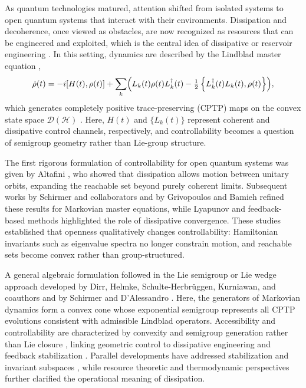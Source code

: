 \documentclass[11pt,reqno]{amsart}
\theoremstyle{definition}
\newcommand{\mc}{\mathcal}
\newcommand{\lset}{\left\{ }
\newcommand{\rset}{\right\} }
\begin{document}
As quantum technologies matured, attention shifted from isolated systems to open quantum systems that interact with their environments.  
Dissipation and decoherence, once viewed as obstacles, are now recognized as resources that can be engineered and exploited, which is the central idea of dissipative or reservoir engineering \cite{verstraete2009,diehl2008,lin2013,mirrahimi2014,leghtas2013,ofek2016,kapit2016}.  
In this setting, dynamics are described by the Lindblad master equation \cite{gorini1976,lindblad1976},
\begin{equation}
  \dot{\rho}(t) = -i[H(t),\rho(t)] 
  + \sum_k \Bigl(L_k(t)\rho(t)L_k^\dagger(t) 
  - \tfrac{1}{2}\lset L_k^\dagger(t)L_k(t), \rho(t)\rset \Bigr),
\end{equation}
which generates completely positive trace-preserving (CPTP) maps on the convex state space $\mc D(\mc H)$ \cite{alicki2007,breuer2002, rivas2012}.  
Here, $H(t)$ and $\{L_k(t)\}$ represent coherent and dissipative control channels, respectively, and controllability becomes a question of semigroup geometry rather than Lie-group structure.

The first rigorous formulation of controllability for open quantum systems was given by Altafini \cite{altafini2003}, who showed that dissipation allows motion between unitary orbits, expanding the reachable set beyond purely coherent limits.  
Subsequent works by Schirmer and collaborators \cite{schirmer2001,dalessandro2010,mirrahimi2007,schirmer2004} and by Grivopoulos and Bamieh \cite{grivopoulos2003} refined these results for Markovian master equations, while Lyapunov and feedback-based methods \cite{mirrahimi2007,mirrahimi2005} highlighted the role of dissipative convergence.  
These studies established that openness qualitatively changes controllability: Hamiltonian invariants such as eigenvalue spectra no longer constrain motion, and reachable sets become convex rather than group-structured.

A general algebraic formulation followed in the Lie semigroup or Lie wedge approach developed by Dirr, Helmke, Schulte-Herbrüggen, Kurniawan, and coauthors \cite{dirr2009,schulte2011,kurniawan2012,altafini2003} and by Schirmer and D'Alessandro \cite{schirmer2004}.  
Here, the generators of Markovian dynamics form a convex cone whose exponential semigroup represents all CPTP evolutions consistent with admissible Lindblad operators.  
Accessibility and controllability are characterized by convexity and semigroup generation rather than Lie closure \cite{lokutsievskiy2021,khaneja2000}, linking geometric control to dissipative engineering and feedback stabilization \cite{ticozzi2008,ticozzi2012}.  
Parallel developments have addressed stabilization \cite{ticozzi2008,ticozzi2012,mirrahimi2014} and invariant subspaces \cite{lidar1998,zanardi1997,viola1999}, while resource theoretic and thermodynamic perspectives \cite{lostaglio2019,brandao2015,baumgratz2014,horodecki2013,ng2015} further clarified the operational meaning of dissipation.
\end{document}
